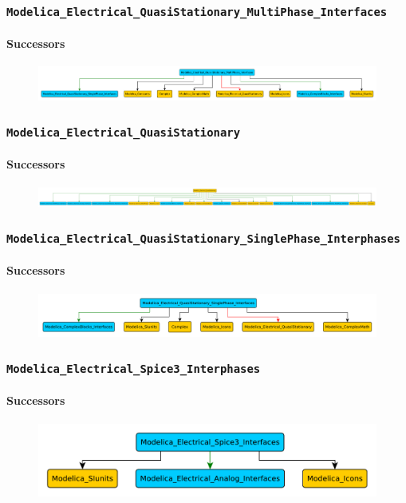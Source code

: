 \documentclass[aspectratio=1610]{beamer}
\begin{document}
\begin{frame}
  \frametitle{\texttt{Modelica\_Electrical\_QuasiStationary\_MultiPhase\_Interfaces}}
  \framesubtitle{Successors}
  \begin{figure}
      \includegraphics[width=\textwidth]{Modelica_Electrical_QuasiStationary_MultiPhase_Interfaces}
  \end{figure}
\end{frame}

\begin{frame}
  \frametitle{\texttt{Modelica\_Electrical\_QuasiStationary}}
  \framesubtitle{Successors}
  \begin{figure}
      \includegraphics[width=\textwidth]{Modelica_Electrical_QuasiStationary}
  \end{figure}
\end{frame}

\begin{frame}
  \frametitle{\texttt{Modelica\_Electrical\_QuasiStationary\_SinglePhase\_Interphases}}
  \framesubtitle{Successors}
  \begin{figure}
      \includegraphics[width=\textwidth]{Modelica_Electrical_QuasiStationary_SinglePhase_Interphases}
  \end{figure}
\end{frame}

\begin{frame}
  \frametitle{\texttt{Modelica\_Electrical\_Spice3\_Interphases}}
  \framesubtitle{Successors}
  \begin{figure}
      \includegraphics[width=\textwidth]{Modelica_Electrical_Spice3_Interphases}
  \end{figure}
\end{frame}
\end{document}
